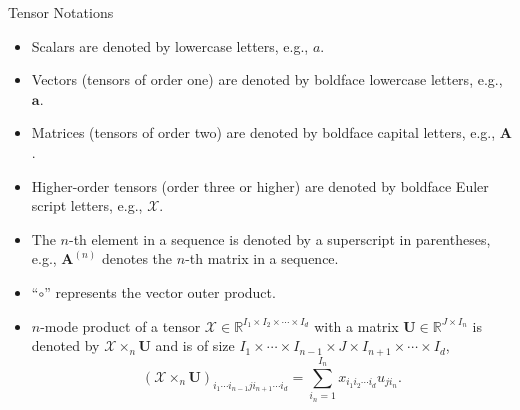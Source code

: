\documentclass[t, 10pt, handout, aspectratio=169]{beamer}
\begin{document}
\begin{frame}{Tensor Notations}
\begin{itemize}
\item Scalars are denoted by lowercase letters, e.g., $a$.
\item Vectors (tensors of order one) are denoted by boldface lowercase letters, e.g., $\mathbf{a}$.
\item Matrices (tensors of order two) are denoted by boldface capital letters, e.g., $\mathbf{A}$.
\item Higher-order tensors (order three or higher) are denoted by boldface Euler script letters, e.g., $\mathcal{X}$.
\item  The $n$-th element in a sequence is denoted by a superscript in parentheses, e.g., $\mathbf{A}^{(n)}$ denotes the $n$-th matrix in a sequence.
\item ``$\circ$'' represents the vector outer product.
\item $n$-mode product of a tensor $\mathcal{X}\in\mathbb{R}^{I_1 \times I_2 \times\cdots\times I_d}$ with a matrix $\mathbf{U}\in\mathbb{R}^{J\times I_n}$ is denoted by $\mathcal{X}\times_n \mathbf{U}$ and is of size $I_1 \times \cdots \times I_{n-1} \times J \times I_{n+1} \times \cdots \times I_d$,
$$
(\mathcal{X}\times_n\mathbf{U})_{i_1\cdots i_{n-1}ji_{n+1}\cdots i_d}=\sum_{i_n=1}^{I_n}x_{i_1i_2\cdots i_d}u_{ji_n}.
$$
\end{itemize}
\end{frame}
\end{document}
